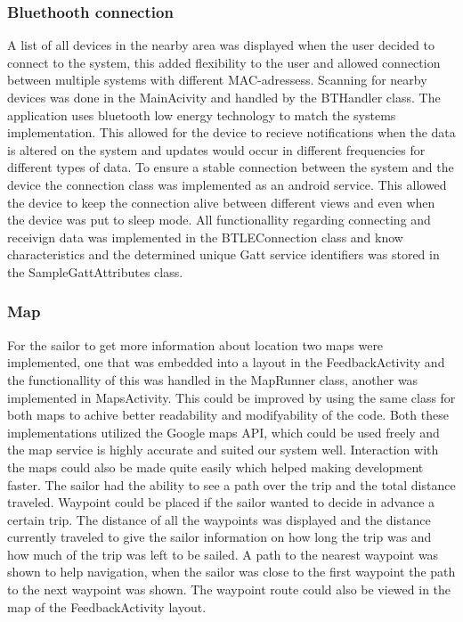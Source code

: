 \subsubsection{Bluethooth connection}
A list of all devices in the nearby area was displayed when the user decided to connect to the system, this added flexibility to the user and allowed connection between multiple systems with different MAC-adressess. Scanning for nearby devices was done in the MainAcivity and handled by the BTHandler class. The application uses bluetooth low energy technology to match the systems implementation. This allowed for the device to recieve notifications when the data is altered on the system and updates would occur in different frequencies for different types of data. To ensure a stable connection between the system and the device the connection class was implemented as an android service\cite{android-service}. This allowed the device to keep the connection alive between different views and even when the device was put to sleep mode. All functionallity regarding connecting and receivign data was implemented in the BTLEConnection class and know characteristics and the determined unique Gatt service identifiers was stored in the SampleGattAttributes class.

\subsubsection{Map}
For the sailor to get more information about location two maps were implemented, one that was embedded into a layout in the FeedbackActivity and the functionallity of this was handled in the MapRunner class, another was implemented in MapsActivity. This could be improved by using the same class for both maps to achive better readability and modifyability of the code. Both these implementations utilized the Google maps API\cite{gmaps}, which could be used freely and the map service is highly accurate and suited our system well. Interaction with the maps could also be made quite easily which helped making development faster. The sailor had the ability to see a path over the trip and the total distance traveled. Waypoint could be placed if the sailor wanted to decide in advance a certain trip. The distance of all the waypoints was displayed and the distance currently traveled to give the sailor information on how long the trip was and how much of the trip was left to be sailed. A path to the nearest waypoint was shown to help navigation, when the sailor was close to the first waypoint the path to the next waypoint was shown. The waypoint route could also be viewed in the map of the FeedbackActivity layout.

